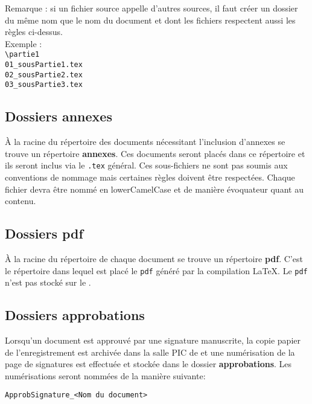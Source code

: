 Remarque : si un fichier source appelle d'autres sources, il faut créer un dossier du même nom que le nom du document et dont les fichiers respectent aussi les règles ci-dessus.\\
Exemple : \\
\verb+\partie1+\\
\hspace*{1cm} \verb+01_sousPartie1.tex+\\
\hspace*{1cm} \verb+02_sousPartie2.tex+\\
\hspace*{1cm} \verb+03_sousPartie3.tex+\\

\subsection{Dossiers annexes}

\`{A} la racine du répertoire des documents nécessitant l'inclusion d'annexes se trouve un répertoire \textbf{annexes}.
Ces documents seront placés dans ce répertoire et ils seront inclus via
le \verb+.tex+ général. Ces sous-fichiers ne sont pas soumis aux conventions de nommage mais certaines règles doivent être respectées. Chaque fichier devra être nommé en lowerCamelCase et de manière évoquateur quant au contenu. 

\subsection{Dossiers pdf}

\`{A} la racine du répertoire de chaque document se trouve un répertoire \textbf{pdf}. C'est
le répertoire dans lequel est placé le \verb+pdf+ généré par la compilation \LaTeX{}. Le \verb+pdf+ n'est pas stocké sur le \git{}.

\subsection{Dossiers approbations}

Lorsqu'un document est approuvé par une signature manuscrite, la copie papier de l'enregistrement est archivée dans la salle PIC de  \nomEquipe{} et une numérisation de la page de signatures est effectuée et stockée dans le dossier \textbf{approbations}. Les numérisations seront nommées de la manière suivante:
\begin{center}
\verb+ApprobSignature_<Nom du document>+
\end{center}

